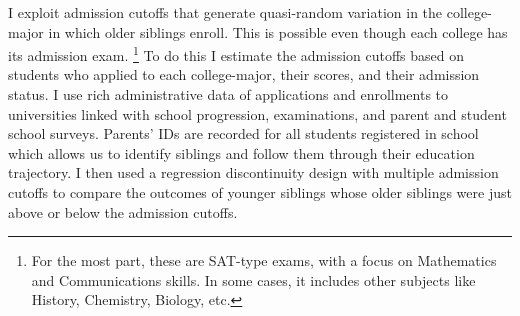 



\begin{comment}
[PEER EFFECTS BARRIOS-FERNANDEZ] information transmission, direct academic support, and changes in preferences (e.g., changes in aspirations and motivation, taste for spending time with peers). Assessing the relevance of these different mechanisms is important to understand which policy tools governments have available to support students. For instance, if the main driver of peer effects on educational trajectories is the transmission of information, then governments could design strategies to substitute for the lack of informed peers and directly provide information to students. 

Independently of the mechanisms behind peer effects, the existence of social spillovers on educational trajectories is relevant to understand inequality in educational achievement. They imply that the consequences of the barriers and challenges disproportionately affecting certain groups of students are amplified through their social networks.
\end{comment}


I exploit admission cutoffs that generate quasi-random variation in the college-major in which older siblings enroll. This is possible even though each college has its admission exam. \footnote{For the most part, these are SAT-type exams, with a focus on Mathematics and Communications skills. In some cases, it includes other subjects like History, Chemistry, Biology, etc.} To do this I estimate the admission cutoffs based on students who applied to each college-major, their scores, and their admission status. I use rich administrative data of applications and enrollments to universities linked with school progression, examinations, and parent and student school surveys. Parents' IDs are recorded for all students registered in school which allows us to identify siblings and follow them through their education trajectory. I then used a regression discontinuity design with multiple admission cutoffs to compare the outcomes of younger siblings whose older siblings were just above or below the admission cutoffs.

